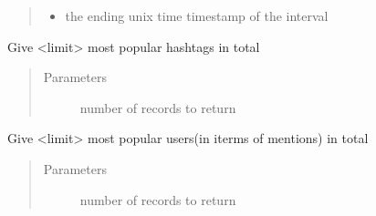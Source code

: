 \documentclass[letterpaper,10pt,english]{sphinxmanual}
\begin{document}
\begin{fulllineitems}
\begin{fulllineitems}
\begin{quote}
\begin{description}
\begin{itemize}
\item {} 
 \textendash{} the ending unix time timestamp of the interval

\end{itemize}

\end{description}\end{quote}

\end{fulllineitems}


\begin{fulllineitems}
\label{\detokenize{mongoDB_query_generation:execute_queries.MongoQuery.mp_ht_in_total}}
Give \textless{}limit\textgreater{} most popular hashtags in total
\begin{quote}\begin{description}
\item[{Parameters}] \leavevmode
{} \textendash{} number of records to return

\end{description}\end{quote}

\end{fulllineitems}


\begin{fulllineitems}
\label{\detokenize{mongoDB_query_generation:execute_queries.MongoQuery.mp_um_in_total}}
Give \textless{}limit\textgreater{} most popular users(in iterms of mentions) in total
\begin{quote}\begin{description}
\item[{Parameters}] \leavevmode
{} \textendash{} number of records to return

\end{description}\end{quote}

\end{fulllineitems}


\end{fulllineitems}
\end{document}
